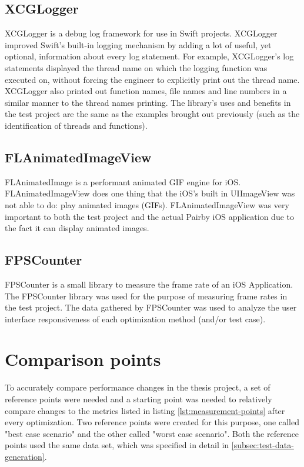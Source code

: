 \documentclass[a4paper,12pt]{article}
\begin{document}
\subsection{XCGLogger}
XCGLogger is a debug log framework for use in Swift projects.\cite{XCGLogger} XCGLogger improved Swift's built-in logging mechanism by adding a lot of useful, yet optional, information about every log statement. For example, XCGLogger's log statements displayed the thread name on which the logging function was executed on, without forcing the engineer to explicitly print out the thread name. XCGLogger also printed out function names, file names and line numbers in a similar manner to the thread names printing. The library's uses and benefits in the test project are the same as the examples brought out previously (such as the identification of threads and functions).

\subsection{FLAnimatedImageView}
FLAnimatedImage is a performant animated GIF engine for iOS.\cite{FLAnimatedImageView} FLAnimatedImageView does one thing that the iOS's built in UIImageView was not able to do: play animated images (GIFs). FLAnimatedImageView was very important to both the test project and the actual Pairby iOS application due to the fact it can display animated images.

\subsection{FPSCounter}
FPSCounter is a small library to measure the frame rate of an iOS Application.\cite{FPSCounterGithub} The FPSCounter library was used for the purpose of measuring frame rates in the test project. The data gathered by FPSCounter was used to analyze the user interface responsiveness of each optimization method (and/or test case).

\section{Comparison points}
To accurately compare performance changes in the thesis project, a set of reference points were needed and a starting point was needed to relatively compare changes to the metrics listed in listing \autoref{lst:measurement-points} after every optimization. Two reference points were created for this purpose, one called "best case scenario" and the other called "worst case scenario". Both the reference points used the same data set, which was specified in detail in \autoref{subsec:test-data-generation}. 
\end{document}
